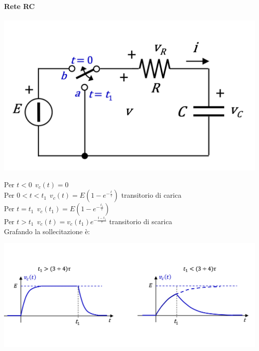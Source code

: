 \documentclass{article}
\theoremstyle{definition}
\begin{document}
\paragraph{Rete RC}
\begin{center}
	\includegraphics[scale=0.25]{immagini/sollecitazione rettangolare.png}
\end{center}
Per $t<0 \ \ v_c(t) = 0$\\
Per $0<t<t_1 \ \ v_c(t) = E(1-e^{-\frac{t}{\tau}})$ transitorio di carica\\
Per $t=t_1 \ \ v_c(t_1) = E(1-e^{-\frac{t_1}{\tau}})$\\
Per $t>t_1 \ \ v_c(t) = v_c(t_1)e^{-\frac{t-t_1}{\tau}}$ transitorio di scarica\\

Grafando la sollecitazione è:
\begin{center}
\includegraphics[scale=0.35]{immagini/grafica soll rett.png}
\end{center}
\end{document}
